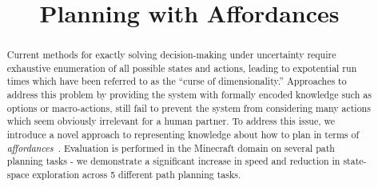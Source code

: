 \documentclass[]{article}
\title{Planning with Affordances}
\begin{document}
\maketitle

\begin{abstract}
Current methods for exactly solving decision-making under uncertainty
require exhaustive enumeration of all possible states and actions,
leading to expotential run times which have been referred to as the
``curse of dimensionality.''  Approaches to address this problem by
providing the system with formally encoded knowledge such as options
or macro-actions, still fail to prevent the system from considering
many actions which seem obviously irrelevant for a human partner.  To
address this issue, we introduce a novel approach to representing
knowledge about how to plan in terms of {\em
  affordances}~\citep{gibson77}.  Evaluation is performed in the
Minecraft domain on several path planning tasks - we demonstrate a
significant increase in speed and reduction in state-space exploration
across 5 different path planning tasks.
\end{abstract}
\end{document}
